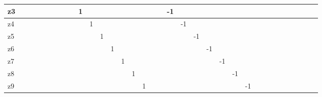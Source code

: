 \begin{table}[]
\begin{tabular}{|l|l|l|l|l|l|l|l|l|l|l|l|l|l|l|l|l|l|l|l|l|l|l|l|l|l|l|l|l|l|l|l|l|l|}
z3  &     &     &     &     &     &     &      &      & 1    &      &      &      &      &      &      &       &       & -1    &       &       &       &       &       &       &    &    &    &    &    &    &    &    &    \\ \hline
z4  &     &     &     &     &     &     &      &      &      & 1    &      &      &      &      &      &       &       &       & -1    &       &       &       &       &       &    &    &    &    &    &    &    &    &    \\ \hline
z5  &     &     &     &     &     &     &      &      &      &      & 1    &      &      &      &      &       &       &       &       & -1    &       &       &       &       &    &    &    &    &    &    &    &    &    \\ \hline
z6  &     &     &     &     &     &     &      &      &      &      &      & 1    &      &      &      &       &       &       &       &       & -1    &       &       &       &    &    &    &    &    &    &    &    &    \\ \hline
z7  &     &     &     &     &     &     &      &      &      &      &      &      & 1    &      &      &       &       &       &       &       &       & -1    &       &       &    &    &    &    &    &    &    &    &    \\ \hline
z8  &     &     &     &     &     &     &      &      &      &      &      &      &      & 1    &      &       &       &       &       &       &       &       & -1    &       &    &    &    &    &    &    &    &    &    \\ \hline
z9  &     &     &     &     &     &     &      &      &      &      &      &      &      &      & 1    &       &       &       &       &       &       &       &       & -1    &    &    &    &    &    &    &    &    &    \\ \hline
\end{tabular}
\end{table}
